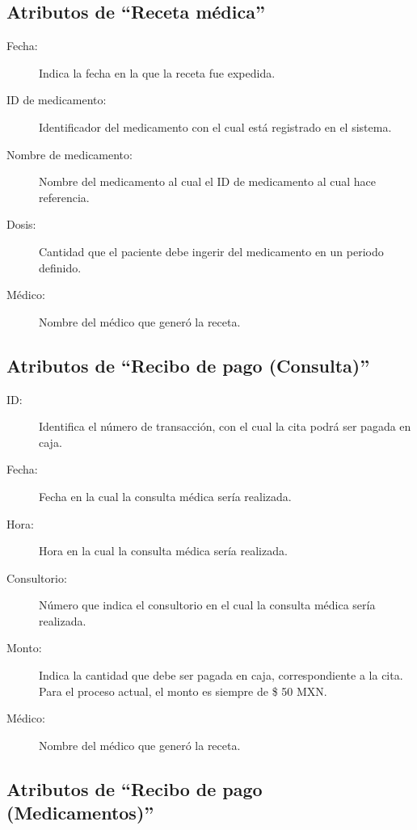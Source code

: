 \subsection{Atributos de ``Receta m\'edica''}

\begin{description}
	\item[Fecha: ] Indica la fecha en la que la receta fue expedida.
	\item[ID de medicamento: ] Identificador del medicamento con el cual est\'a registrado en el sistema.
	\item[Nombre de medicamento: ] Nombre del medicamento al cual el ID de medicamento al cual hace referencia.
	\item[Dosis: ] Cantidad que el paciente debe ingerir del medicamento en un periodo definido.
	\item[M\'edico: ] Nombre del m\'edico que gener\'o la receta.
\end{description}
\subsection{Atributos de ``Recibo de pago (Consulta)''}

\begin{description}
	\item[ID: ] Identifica el n\'umero de transacci\'on, con el cual la cita podr\'a ser pagada en caja.
	\item[Fecha: ] Fecha en la cual la consulta m\'edica ser\'ia realizada.
	\item[Hora: ] Hora en la cual la consulta m\'edica ser\'ia realizada.
	\item[Consultorio: ] N\'umero que indica el consultorio en el cual la consulta m\'edica ser\'ia realizada.
	\item[Monto: ] Indica la cantidad que debe ser pagada en caja, correspondiente a la cita. Para el proceso actual, el monto es siempre de \$ 50 MXN.
	\item[M\'edico: ] Nombre del m\'edico que gener\'o la receta.
\end{description}
\subsection{Atributos de ``Recibo de pago (Medicamentos)''}

